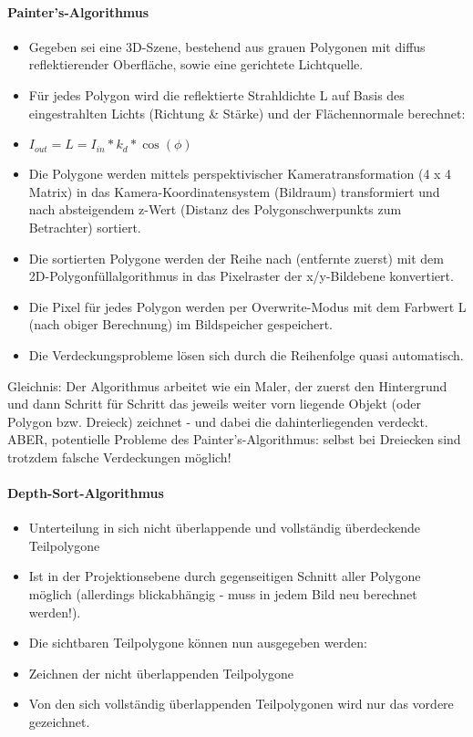 \documentclass[10pt,landscape]{article}
\begin{document}
\begin{multicols}{3}
{  \paragraph{Painter’s-Algorithmus}
  \begin{itemize}
    \item Gegeben sei eine 3D-Szene, bestehend aus grauen Polygonen mit diffus reflektierender Oberfläche, sowie eine gerichtete Lichtquelle.
    \item Für jedes Polygon wird die reflektierte Strahldichte L auf Basis des eingestrahlten Lichts (Richtung \& Stärke) und der Flächennormale berechnet:
    \item $I_{out} = L = I_{in}* k_d * \cos(\phi)$
    \item Die Polygone werden mittels perspektivischer Kameratransformation (4 x 4 Matrix) in das Kamera-Koordinatensystem (Bildraum) transformiert und nach absteigendem z-Wert (Distanz des Polygonschwerpunkts zum Betrachter) sortiert.
    \item Die sortierten Polygone werden der Reihe nach (entfernte zuerst) mit dem 2D-Polygonfüllalgorithmus in das Pixelraster der x/y-Bildebene konvertiert.
    \item Die Pixel für jedes Polygon werden per Overwrite-Modus mit dem Farbwert L (nach obiger Berechnung) im Bildspeicher gespeichert.
    \item Die Verdeckungsprobleme lösen sich durch die Reihenfolge quasi automatisch.
  \end{itemize}
  
  Gleichnis: Der Algorithmus arbeitet wie ein Maler, der zuerst den Hintergrund und dann Schritt für Schritt das jeweils weiter vorn liegende Objekt (oder Polygon bzw. Dreieck) zeichnet - und dabei die dahinterliegenden verdeckt. ABER, potentielle Probleme des Painter’s-Algorithmus: selbst bei Dreiecken sind trotzdem falsche Verdeckungen möglich!
  
  \paragraph{Depth-Sort-Algorithmus}
  \begin{itemize}
    \item Unterteilung in sich nicht überlappende und vollständig überdeckende Teilpolygone
    \item Ist in der Projektionsebene durch gegenseitigen Schnitt aller Polygone möglich (allerdings blickabhängig - muss in jedem Bild neu berechnet werden!).
    \item Die sichtbaren Teilpolygone können nun ausgegeben werden:
    \item Zeichnen der nicht überlappenden Teilpolygone
    \item Von den sich vollständig überlappenden Teilpolygonen wird nur das vordere gezeichnet.
  \end{itemize}
  
}
\end{multicols}
\end{document}
